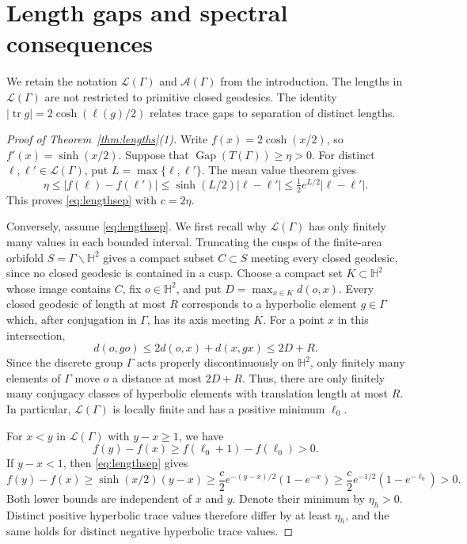 \documentclass[reqno]{amsart}
\theoremstyle{remark}
\DeclareMathOperator{\tr}{tr}
\DeclareMathOperator{\Gap}{Gap}
\begin{document}
\section{Length gaps and spectral consequences}\label{sec:lengths}

We retain the notation $\mathcal L(\Gamma)$ and $\mathcal A(\Gamma)$ from the introduction. The lengths in $\mathcal L(\Gamma)$ are not restricted to primitive closed geodesics. The identity $|\tr g|=2\cosh(\ell(g)/2)$ relates trace gaps to separation of distinct lengths.

\begin{proof}[Proof of Theorem~\ref{thm:lengths}(1)]
Write $f(x)=2\cosh(x/2)$, so $f'(x)=\sinh(x/2)$. Suppose that $\Gap(T(\Gamma))\ge\eta>0$. For distinct $\ell,\ell'\in\mathcal L(\Gamma)$, put $L=\max\{\ell,\ell'\}$. The mean value theorem gives
$$
\eta\le |f(\ell)-f(\ell')|
\le \sinh(L/2)|\ell-\ell'|
\le \tfrac12e^{L/2}|\ell-\ell'|.
$$
This proves \eqref{eq:lengthsep} with $c=2\eta$.

Conversely, assume \eqref{eq:lengthsep}. We first recall why $\mathcal L(\Gamma)$ has only finitely many values in each bounded interval. Truncating the cusps of the finite-area orbifold $S=\Gamma\backslash\mathbb H^2$ gives a compact subset $C\subset S$ meeting every closed geodesic, since no closed geodesic is contained in a cusp. Choose a compact set $K\subset\mathbb H^2$ whose image contains $C$, fix $o\in\mathbb H^2$, and put $D=\max_{x\in K}d(o,x)$. Every closed geodesic of length at most $R$ corresponds to a hyperbolic element $g\in\Gamma$ which, after conjugation in $\Gamma$, has its axis meeting $K$. For a point $x$ in this intersection,
$$
d(o,go)\le 2d(o,x)+d(x,gx)\le 2D+R.
$$
Since the discrete group $\Gamma$ acts properly discontinuously on $\mathbb H^2$, only finitely many elements of $\Gamma$ move $o$ a distance at most $2D+R$. Thus, there are only finitely many conjugacy classes of hyperbolic elements with translation length at most $R$. In particular, $\mathcal L(\Gamma)$ is locally finite and has a positive minimum $\ell_0$.

For $x<y$ in $\mathcal L(\Gamma)$ with $y-x\ge1$, we have
$$
f(y)-f(x)\ge f(\ell_0+1)-f(\ell_0)>0.
$$
If $y-x<1$, then \eqref{eq:lengthsep} gives
$$
f(y)-f(x)\ge \sinh(x/2)(y-x)
\ge \frac{c}{2}e^{-(y-x)/2}(1-e^{-x})
\ge \frac{c}{2}e^{-1/2}(1-e^{-\ell_0})>0.
$$
Both lower bounds are independent of $x$ and $y$. Denote their minimum by $\eta_h>0$. Distinct positive hyperbolic trace values therefore differ by at least $\eta_h$, and the same holds for distinct negative hyperbolic trace values.


\end{proof}
\end{document}
